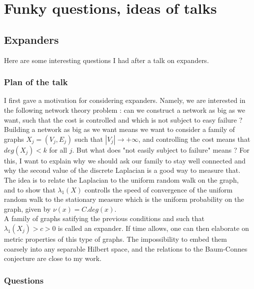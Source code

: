 \section{Funky questions, ideas of talks}

\subsection{Expanders}

Here are some interesting questions I had after a talk on expanders. 

\subsubsection{Plan of the talk}

I first gave a motivation for considering expanders. Namely, we are interested in the following network theory problem : can we construct a network as big as we want, such that the cost is controlled and which is not subject to easy failure ?\\

Building a network as big as we want means we want to consider a family of graphs $X_j = (V_j,E_j)$ such that $|V_j|\rightarrow +\infty$, and controlling the cost means that $deg(X_j) < k$ for all $j$. But what does "not easily subject to failure" means ? For this, I want to explain why we should ask our family to stay well connected and why the second value of the discrete Laplacian is a good way to measure that.\\

The idea is to relate the Laplacian to the uniform random walk on the graph, and to show that $\lambda_1(X)$ controlls the speed of convergence of the uniform random walk to the stationary measure which is the uniform probability on the graph, given by $\nu(x)= C. deg(x)$.\\

A family of graphs satifying the previous conditions and such that $\lambda_1(X_j) >c >0$ is called an expander. If time allows, one can then elaborate on metric properties of this type of graphs. The impossibility to embed them coarsely into any separable Hilbert space, and the relations to the Baum-Connes conjecture are close to my work.

\subsubsection{Questions}

